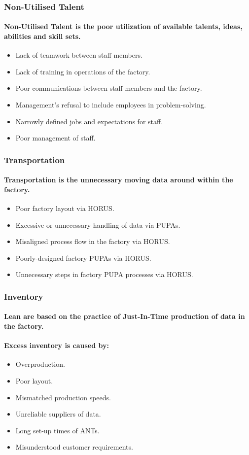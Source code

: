\documentclass{acm_proc_article-sp}
\begin{document}
\subsubsection{Non-Utilised Talent}
\paragraph{Non-Utilised Talent is the poor utilization of available talents, ideas, abilities and skill sets.}
\begin{itemize}
\item Lack of teamwork between staff members.
\item Lack of training in operations of the factory.
\item Poor communications between staff members and the factory.
\item Management's refusal to include employees in problem-solving.
\item Narrowly defined jobs and expectations for staff.
\item Poor management of staff.
\end{itemize}
\subsubsection{Transportation}
\paragraph{Transportation is the unnecessary moving data around within the factory.}
\begin{itemize}
\item Poor factory layout via HORUS.
\item Excessive or unnecessary handling of data via PUPAs.
\item Misaligned process flow in the factory via HORUS.
\item Poorly-designed factory PUPAs via HORUS.
\item Unnecessary steps in factory PUPA processes via HORUS.
\end{itemize}
\subsubsection{Inventory}
\paragraph{Lean are based on the practice of Just-In-Time production of data in the factory.}
\paragraph{Excess inventory is caused by:}
\begin{itemize}
\item Overproduction.
\item Poor layout.
\item Mismatched production speeds.
\item Unreliable suppliers of data.
\item Long set-up times of ANTs.
\item Misunderstood customer requirements.
\end{itemize}
\end{document}
